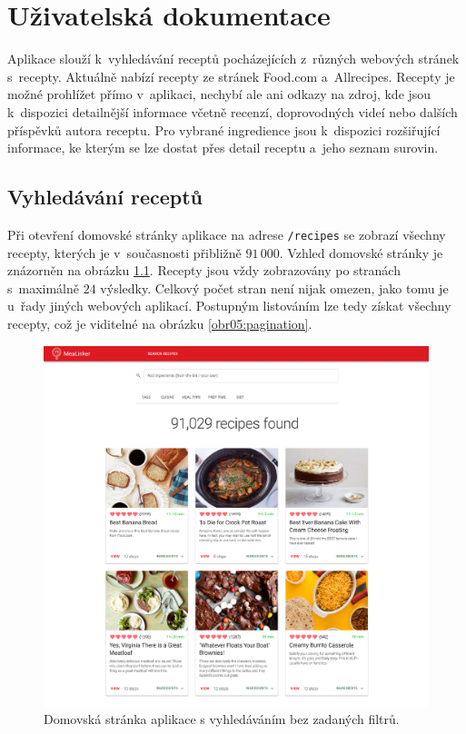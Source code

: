 \chapter{Uživatelská dokumentace}

Aplikace slouží k~vyhledávání receptů pocházejících z~různých webových stránek s~recepty. Aktuálně nabízí recepty ze stránek Food.com a~Allrecipes. Recepty je možné prohlížet přímo v~aplikaci, nechybí ale ani odkazy na zdroj, kde jsou k~dispozici detailnější informace včetně recenzí, doprovodných videí nebo dalších příspěvků autora receptu. Pro vybrané ingredience jsou k~dispozici rozšiřující informace, ke kterým se lze dostat přes detail receptu a~jeho seznam surovin.

\section{Vyhledávání receptů}

Při otevření domovské stránky aplikace na adrese \texttt{/recipes} se zobrazí všechny recepty, kterých je v~současnosti přibližně $91\,000$. Vzhled domovské stránky je znázorněn na obrázku \ref{obr05:homepage}. Recepty jsou vždy zobrazovány po stranách s~maximálně $24$ výsledky. Celkový počet stran není nijak omezen, jako tomu je u~řady jiných webových aplikací. Postupným listováním lze tedy získat všechny recepty, což je viditelné na obrázku \ref{obr05:pagination}.

\begin{figure}[h!]\centering
\includegraphics[width=140mm]{../img/homepage}
\caption{Domovská stránka aplikace s vyhledáváním bez zadaných filtrů.}
\label{obr05:homepage}
\end{figure}


